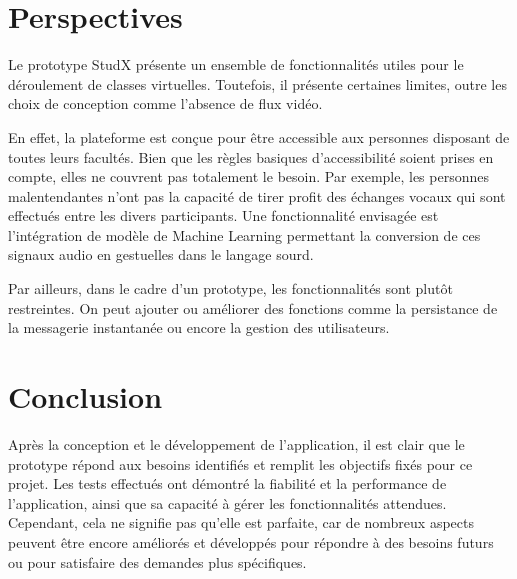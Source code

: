 \section{Perspectives}
Le prototype StudX présente un ensemble de fonctionnalités utiles pour le déroulement de classes virtuelles. 
Toutefois, il présente certaines limites, outre les choix de conception comme l’absence de flux vidéo. 

En effet, la plateforme est conçue pour être accessible aux personnes disposant de toutes leurs facultés. 
Bien que les règles basiques d'accessibilité soient prises en compte, 
elles ne couvrent pas totalement le besoin. Par exemple, les personnes malentendantes 
n’ont pas la capacité de tirer profit des échanges vocaux qui sont effectués entre les divers participants. 
Une fonctionnalité envisagée est l'intégration de modèle de Machine Learning permettant la conversion de 
ces signaux audio en gestuelles dans le langage sourd.

Par ailleurs, dans le cadre d’un prototype, les fonctionnalités sont plutôt restreintes. 
On peut ajouter ou améliorer des fonctions comme la persistance de la messagerie instantanée ou 
encore la gestion des utilisateurs.


\section*{Conclusion}
Après la conception et le développement de l'application, il est clair que le prototype répond aux besoins identifiés et remplit les objectifs fixés pour ce projet. 
Les tests effectués ont démontré la fiabilité et la performance de l'application, ainsi que sa capacité à gérer les fonctionnalités attendues. 
Cependant, cela ne signifie pas qu'elle est parfaite, car  de nombreux aspects peuvent être encore améliorés et développés pour répondre à des besoins futurs ou pour satisfaire des demandes plus spécifiques. 